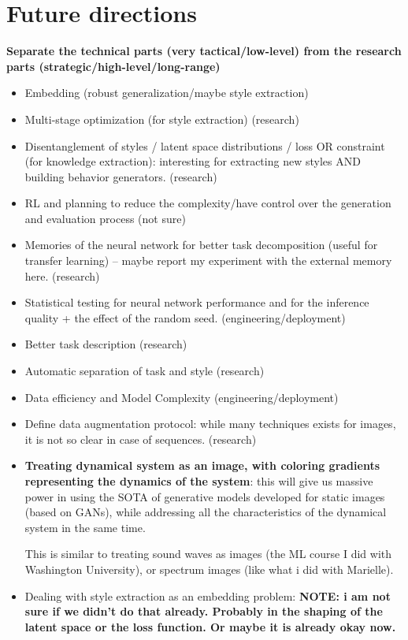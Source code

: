\section{Future directions}\label{sec:future_direction}
\textbf{Separate the technical parts (very tactical/low-level) from the research parts (strategic/high-level/long-range)}
\begin{itemize}[noitemsep]
    \item Embedding (robust generalization/maybe style extraction)
    \item Multi-stage optimization (for style extraction) (research)
    \item Disentanglement of styles / latent space distributions / loss OR constraint (for knowledge extraction): interesting for extracting new styles AND building behavior generators. (research)
    \item RL and planning to reduce the complexity/have control over the generation and evaluation process (not sure)
    \item Memories of the neural network for better task decomposition (useful for transfer learning) -- maybe report my experiment with the external memory here. (research)
    \item Statistical testing for neural network performance and for the inference quality + the effect of the random seed. (engineering/deployment)
    \item Better task description (research)
    \item Automatic separation of task and style (research)
    \item Data efficiency and Model Complexity (engineering/deployment)
    \item Define data augmentation protocol: while many techniques exists for images, it is not so clear in case of sequences. (research)
    \item \textbf{Treating dynamical system as an image, with coloring gradients representing the dynamics of the system}: this will give us massive power in using the SOTA of generative models developed for static images (based on GANs), while addressing all the characteristics of the dynamical system in the same time.

    This is similar to treating sound waves as images (the ML course I did with Washington University), or spectrum images (like what i did with Marielle).

    \item Dealing with style extraction as an embedding problem: \textbf{NOTE: i am not sure if we didn't do that already. Probably in the shaping of the latent space or the loss function. Or maybe it is already okay now. }


\end{itemize}
